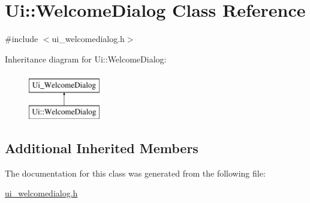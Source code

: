 \hypertarget{class_ui_1_1_welcome_dialog}{}\section{Ui\+:\+:Welcome\+Dialog Class Reference}
\label{class_ui_1_1_welcome_dialog}


{\ttfamily \#include $<$ui\+\_\+welcomedialog.\+h$>$}

Inheritance diagram for Ui\+:\+:Welcome\+Dialog\+:\begin{figure}[H]
\begin{center}
\leavevmode
\includegraphics[height=2.000000cm]{class_ui_1_1_welcome_dialog}
\end{center}
\end{figure}
\subsection*{Additional Inherited Members}


The documentation for this class was generated from the following file\+:\begin{DoxyCompactItemize}
\item 
\hyperlink{ui__welcomedialog_8h}{ui\+\_\+welcomedialog.\+h}\end{DoxyCompactItemize}
